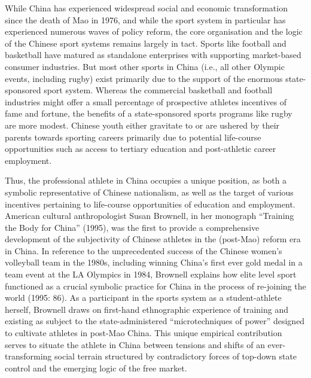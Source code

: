 \begin{CJK}{UTF8}{gbsn}
 While China has experienced widespread social and economic transformation since the death of Mao in 1976, and while the sport system in particular has experienced numerous waves of policy reform,  the core organisation and the logic of the Chinese sport systems remains largely in tact.  Sports like football and basketball have matured as standalone enterprises with supporting market-based consumer industries.  But most other sports in China (i.e., all other Olympic events, including rugby) exist primarily due to the support of the enormous state-sponsored sport system.  Whereas the commercial basketball and football industries might offer a small percentage of prospective athletes incentives of fame and fortune, the benefits of a state-sponsored sports programs like rugby are more modest.  Chinese youth either gravitate to or are ushered by their parents towards sporting careers primarily due to potential life-course opportunities such as access to tertiary education and post-athletic career employment.

 Thus, the professional athlete in China occupies a unique position, as both a symbolic representative of Chinese nationalism, as well as the target of various incentives pertaining to life-course opportunities of education and employment.  American cultural anthropologist Susan Brownell, in her monograph ``Training the Body for China'' (1995), was the first to provide a comprehensive development of the subjectivity of Chinese athletes in the (post-Mao) reform era in China.  In reference to the unprecedented success of the Chinese women's volleyball team in the 1980s, including winning China's first ever gold medal in a team event at the LA Olympics in 1984, Brownell explains how elite level sport functioned as a crucial symbolic practice for China in the process of re-joining the world (1995: 86).  As a participant in the sports system as a student-athlete herself, Brownell draws on first-hand ethnographic experience of training and existing as subject to the state-administered ``microtechniques of power'' \citep[citing][]{Foucault1977} designed to cultivate athletes in post-Mao China.  This unique empirical contribution serves to situate the athlete in China between tensions and shifts of an ever-transforming social terrain structured by contradictory forces of top-down state control and the emerging logic of the free market.


\end{CJK}
